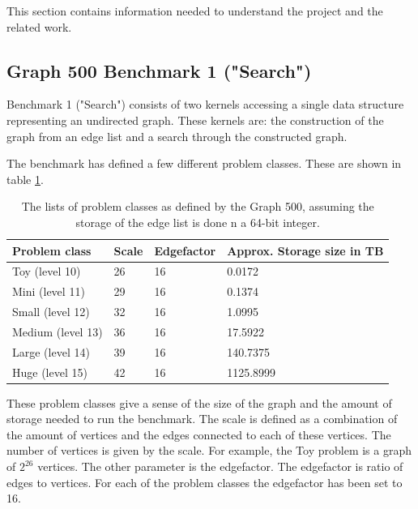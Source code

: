 This section contains information needed to understand the project and the related work.




\subsection{Graph 500 Benchmark 1 ("Search")}
Benchmark 1 ("Search")\cite{graph500-specs} consists of two kernels accessing a single data structure representing an undirected graph. These kernels are: the construction of the graph from an edge list and a search through the constructed graph. 

The benchmark has defined a few different problem classes. These are shown in table \ref{tab:problem_scales}. 
\begin{table}[!h]
	\begin{center}
	\begin{tabular}{|l|l|l|l|}
		\hline
		Problem class     & Scale & Edgefactor & Approx. Storage size in TB \\ \hline
		Toy (level 10)    & 26    & 16          & 0.0172                     \\ \hline
		Mini (level 11)   & 29    & 16          & 0.1374                     \\ \hline
		Small (level 12)  & 32    & 16          & 1.0995                     \\ \hline
		Medium (level 13) & 36    & 16          & 17.5922                    \\ \hline
		Large (level 14)  & 39    & 16          & 140.7375                   \\ \hline
		Huge (level 15)   & 42    & 16          & 1125.8999                  \\ \hline
	\end{tabular}
	\caption{The lists of problem classes as defined by the Graph 500, assuming the storage of the edge list is done n a 64-bit integer.}
	\label{tab:problem_scales}
	\end{center}
\end{table}
These problem classes give a sense of the size of the graph and the amount of storage needed to run the benchmark. The scale is defined as a combination of the amount of vertices and the edges connected to each of these vertices. The number of vertices is given by the scale. For example, the Toy problem is a graph of  $2^26$ vertices. The other parameter is the edgefactor. The edgefactor is ratio of edges to vertices. For each of the problem classes the edgefactor has been set to 16. 


